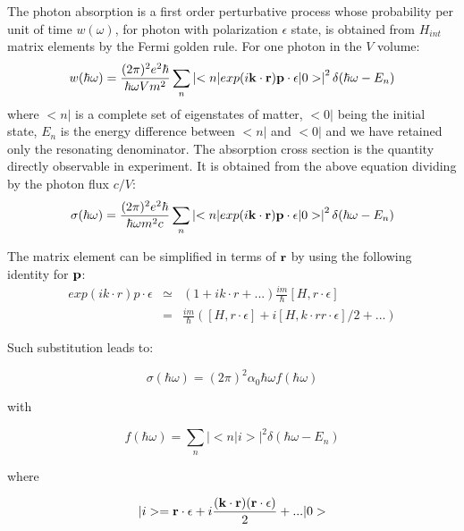 \documentclass[a4paper,11pt]{report}
\begin{document}
The photon absorption is  a first order perturbative process whose probability  per unit of time $w(\omega)$, 
for photon with polarization  $\epsilon$  state, 
is obtained from  $H_{int}$  matrix elements by the Fermi golden rule. For one photon in the $V$ volume:
\begin{equation}
  w(\hbar \omega) = \frac{(2 \pi)^2 e^2 \hbar }{\hbar \omega  V m^2 }  \sum_n  \left|< n |  exp(i { {\bf k} \cdot {\bf  r}} ) { {\bf  p} \cdot  {\bf \epsilon} } | 0 >\right|^2   \delta( \hbar \omega-E_n) 
\end{equation}
where $<n|$ is a complete set of eigenstates of matter, $<0|$  being the initial state, $ E_n$ is the energy difference between $<n|$ and $<0|$  and we have retained only the resonating denominator. 
The absorption cross section is the quantity directly observable in experiment. It is obtained from the above equation dividing by the photon flux  $c/V$:
\begin{equation}
  \sigma(\hbar \omega) = \frac{(2 \pi)^2 e^2 \hbar }{\hbar \omega   m^2 c }  \sum_n  \left|< n |  exp(i { {\bf k} \cdot {\bf  r}} ) { {\bf  p} \cdot  {\bf \epsilon} } | 0 >\right|^2   \delta( \hbar \omega-E_n) 
\end{equation}

The matrix element can be simplified in terms of ${\bf r}$ by using the following identity for  ${\bf p}$:
\begin{eqnarray}
 exp(i {  k \cdot r} ) {  p \cdot  \epsilon }
 & \simeq & ( 1 + i    k \cdot  r + ...  ) \frac{i m}{\hbar} [ H, {  r \cdot  \epsilon }] \\ 
 & = &
  \displaystyle\frac{i m}{\hbar} ([ H, {  r \cdot  \epsilon }] + i [ H, {  k \cdot r}  {  r \cdot  \epsilon }] /2 + ...) \label{expansion} \nonumber
\end{eqnarray} 

Such substitution leads to:

\begin{equation}
  \sigma(\hbar \omega) = (2 \pi)^2  \alpha_0   \hbar \omega    f(\hbar \omega)
\end{equation}

with 

\begin{equation}
  f(\hbar \omega)  =  \sum_n  \left| < n | i > \right|^2   \delta( \hbar \omega-E_n) \nonumber
\end{equation}


where 

\begin{equation}
  |i> = { {\bf  r} \cdot  {\bf \epsilon} }  + i\frac{( { \bf k \cdot r})(  {\bf  r \cdot  \epsilon })}{2} +... | 0 > 
\end{equation}
\end{document}
